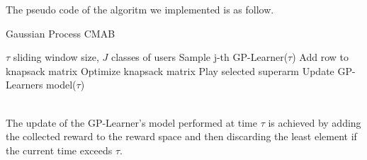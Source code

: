 The pseudo code of the algoritm we implemented is as follow.
\begin{algorithm}
	\caption{Gaussian Process CMAB}
	\begin{algorithmic}[1]
		\renewcommand{\algorithmicrequire}{\textbf{Input:}}
		\REQUIRE $\tau$ sliding window size, $J$ classes of users
		\STATE Sample j-th GP-Learner($\tau$)
		\STATE Add row to knapsack matrix
		\ENDFOR
		\STATE Optimize knapsack matrix
		\STATE Play selected superarm
		\STATE Update GP-Learners model($\tau$)
	\end{algorithmic}
\end{algorithm}
\\The update of the GP-Learner's model performed at time $\tau$ is achieved by adding the collected reward to the reward space and then discarding the least element if the current time exceeds $\tau$.